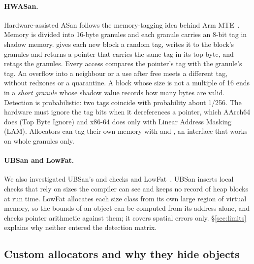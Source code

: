 \paragraph{HWASan.} Hardware-assisted ASan follows the memory-tagging idea behind Arm MTE~\cite{serebryany2018mte,hwasandesign}. Memory is divided into 16-byte granules and each granule carries an 8-bit tag in shadow memory.  gives each new block a random tag, writes it to the block's granules and returns a pointer that carries the same tag in its top byte, and  retags the granules. Every access compares the pointer's tag with the granule's tag. An overflow into a neighbour or a use after free meets a different tag, without redzones or a quarantine. A block whose size is not a multiple of 16 ends in a \emph{short granule} whose shadow value records how many bytes are valid. Detection is probabilistic: two tags coincide with probability about 1/256. The hardware must ignore the tag bits when it dereferences a pointer, which AArch64 does (Top Byte Ignore) and x86-64 does only with Linear Address Masking (LAM). Allocators can tag their own memory with  and , an interface that works on whole granules only.

\paragraph{UBSan and LowFat.} We also investigated UBSan's  and  checks and LowFat~\cite{duck2016lowfat}. UBSan inserts local checks that rely on sizes the compiler can see and keeps no record of heap blocks at run time. LowFat allocates each size class from its own large region of virtual memory, so the bounds of an object can be computed from its address alone, and checks pointer arithmetic against them; it covers spatial errors only. \S\ref{sec:limits} explains why neither entered the detection matrix.

\subsection{Custom allocators and why they hide objects}

